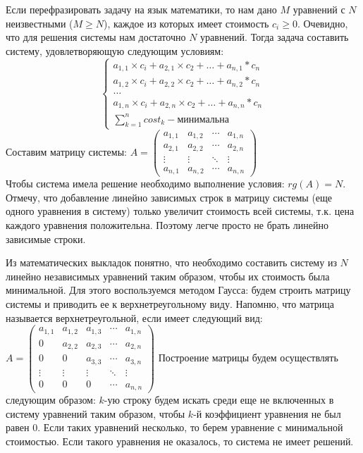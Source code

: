 \documentclass[12pt]{article}
\begin{document}
	Если перефразировать задачу на язык математики, то нам дано $M$ уравнений с $N$ неизвестными ($M \geq N$), каждое из которых имеет стоимость $c_i \geq 0$.
	Очевидно, что для решения системы нам достаточно $N$ уравнений. Тогда задача составить систему, удовлетворяющую следующим условиям:
		\begin{equation*}
		\begin{cases}
			a_{1, 1} \times c_i + a_{2, 1} \times c_2 + \ldots + a_{n, 1} * c_{n}
			\\
			a_{1, 2} \times c_i + a_{2, 2} \times c_2 + \ldots + a_{n, 2} * c_{n}
			\\
			\ldots
			\\
			a_{1, n} \times c_i + a_{2, n} \times c_2 + \ldots + a_{n, n} * c_{n}
			\\
			\sum\limits_{k = 1}^{n} cost_k - \text{минимальна}
		\end{cases}
	\end{equation*}
	Составим матрицу системы:
	$
	A = 
	\begin{pmatrix}
		a_{1,1} & a_{1,2} & \cdots & a_{1,n} \\
		a_{2,1} & a_{2,2} & \cdots & a_{2,n} \\
		\vdots  & \vdots  & \ddots & \vdots  \\
		a_{n,1} & a_{n,2} & \cdots & a_{n,n} 
	\end{pmatrix}
$
\\
	Чтобы система имела решение необходимо выполнение условия: $rg(A) = N$.
	Отмечу, что добавление линейно зависимых строк в матрицу системы (еще одного уравнения в систему) только увеличит стоимость всей системы, т.к. цена каждого уравнения положительна. Поэтому легче просто не брать линейно зависимые строки.
	
	Из математических выкладок понятно, что необходимо составить систему из $N$ линейно независимых уравнений таким образом, чтобы их стоимость была минимальной. Для этого воспользуемся методом Гаусса: будем строить матрицу системы и приводить ее к верхнетреугольному виду.
	Напомню, что матрица называется верхнетреугольной, если имеет следующий вид:
	$
	A = 
	\begin{pmatrix}
		a_{1,1} & a_{1,2} & a_{1, 3} & \cdots & a_{1,n} \\
		0 & a_{2,2} & a_{2, 3} &  \cdots & a_{2,n} \\
		0 & 0 & a_{3, 3} & \cdots & a_{3, n} \\
		\vdots  & \vdots  & \vdots & \ddots & \vdots  \\
		0 & 0 &0 &\cdots & a_{n,n} 
	\end{pmatrix}
$
	Построение матрицы будем осуществлять следующим образом: $k$-ую строку будем искать среди еще не включенных в систему уравнений таким образом, чтобы $k$-й коэффициент уравнения не был равен $0$. Если таких уравнений несколько, то берем уравнение с минимальной стоимостью. Если такого уравнения не оказалось, то система не имеет решений.
	
\end{document}

